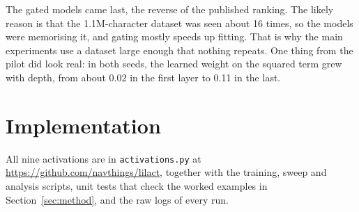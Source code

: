 \documentclass{article}
\begin{document}
The gated models came last, the reverse of the published ranking.
The likely reason is that the 1.1M-character dataset was seen about 16 times, so the models were memorising it, and gating mostly speeds up fitting.
That is why the main experiments use a dataset large enough that nothing repeats.
One thing from the pilot did look real: in both seeds, the learned weight on the squared term grew with depth, from about 0.02 in the first layer to 0.11 in the last.

\section{Implementation}
\label{app:code}

All nine activations are in \texttt{activations.py} at \url{https://github.com/navthings/lilact}, together with the training, sweep and analysis scripts, unit tests that check the worked examples in Section~\ref{sec:method}, and the raw logs of every run.
\end{document}
